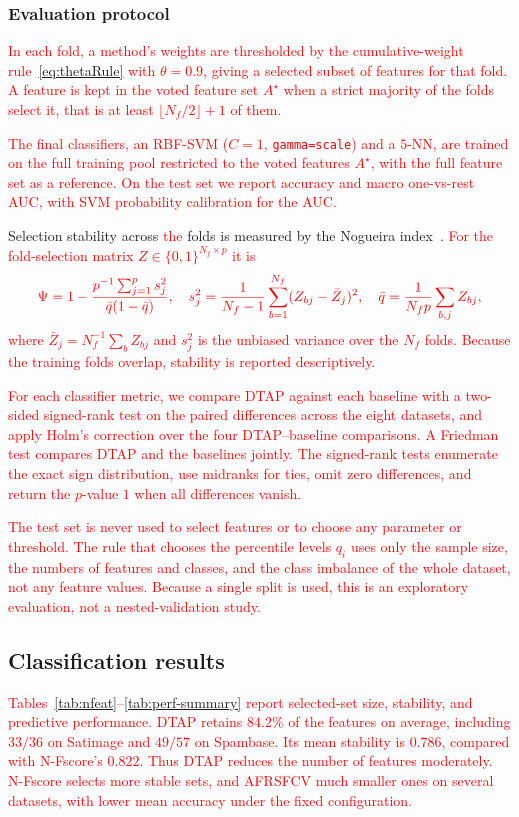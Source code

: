 \documentclass[]{interact}
\theoremstyle{plain}
\theoremstyle{definition}
\theoremstyle{remark}
\begin{document}
\subsubsection{Evaluation protocol}\label{sssec:protocol}
\leavevmode\textcolor{red}{In each fold, a method's weights are thresholded by the cumulative-weight rule~\eqref{eq:thetaRule} with $\theta=0.9$, giving a selected subset of features for that fold. A feature is kept in the voted feature set $A^\star$ when a strict majority of the folds select it, that is at least $\lfloor N_f/2\rfloor+1$ of them.}

\leavevmode\textcolor{red}{The final classifiers, an RBF-SVM ($C=1$, \texttt{gamma=scale}) and a $5$-NN, are trained on the full training pool restricted to the voted features $A^\star$, with the full feature set as a reference. On the test set we report accuracy and macro one-vs-rest AUC, with SVM probability calibration for the AUC.}

Selection stability across \leavevmode\textcolor{red}{the} folds is measured by the Nogueira index~\citep{nogueira2018}. \leavevmode\textcolor{red}{For the fold-selection matrix $Z\in\{0,1\}^{N_f\times p}$ it is}
\[\textcolor{red}{
\Psi=1-\frac{p^{-1}\sum_{j=1}^{p}s_j^2}{\bar q(1-\bar q)},\quad
s_j^2=\frac{1}{N_f-1}\sum_{b=1}^{N_f}(Z_{bj}-\bar Z_j)^2,\quad
\bar q=\frac{1}{N_f p}\sum_{b,j}Z_{bj},
}\]
\leavevmode\textcolor{red}{where $\bar Z_j=N_f^{-1}\sum_b Z_{bj}$ and $s_j^2$ is the unbiased variance over the $N_f$ folds. Because the training folds overlap, stability is reported descriptively.}

\leavevmode\textcolor{red}{For each classifier metric, we compare DTAP against each baseline with a two-sided signed-rank test on the paired differences across the eight datasets, and apply Holm's correction over the four DTAP--baseline comparisons. A Friedman test compares DTAP and the baselines jointly. The signed-rank tests enumerate the exact sign distribution, use midranks for ties, omit zero differences, and return the $p$-value $1$ when all differences vanish.}

\leavevmode\textcolor{red}{The test set is never used to select features or to choose any parameter or threshold. The rule that chooses the percentile levels $q_i$ uses only the sample size, the numbers of features and classes, and the class imbalance of the whole dataset, not any feature values. Because a single split is used, this is an exploratory evaluation, not a nested-validation study.}

\subsection{Classification results}\label{ssec:results}
\leavevmode\textcolor{red}{Tables~\ref{tab:nfeat}--\ref{tab:perf-summary} report selected-set size, stability, and predictive performance. DTAP retains $84.2\%$ of the features on average, including $33/36$ on Satimage and $49/57$ on Spambase. Its mean stability is $0.786$, compared with N-Fscore's $0.822$. Thus DTAP reduces the number of features moderately. N-Fscore selects more stable sets, and AFRSFCV much smaller ones on several datasets, with lower mean accuracy under the fixed configuration.}
\end{document}
